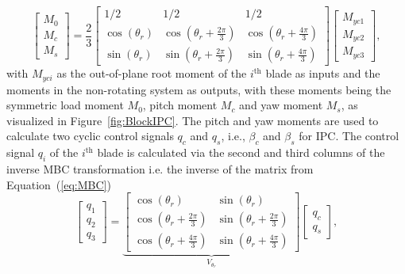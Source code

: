 \begin{equation} \label{eq:MBC}
    \left[ \begin{array}{c}
        M_0\\
        M_c\\
        M_s
    \end{array} \right] = \frac{2}{3}
    \left[ \begin{array}{ccc}
        1/2 & 1/2 & 1/2\\
        \cos(\theta_{r}) & \cos(\theta_{r} + \frac{2\pi}{3}) & \cos(\theta_{r} + \frac{4\pi}{3})\\
        \sin(\theta_{r}) & \sin(\theta_{r} + \frac{2\pi}{3}) & \sin(\theta_{r} + \frac{4\pi}{3})
    \end{array} \right]
    \left[ \begin{array}{c}
        M_{yc1}\\
        M_{yc2}\\
        M_{yc3}
    \end{array} \right], 
\end{equation}
with  $M_{yci}$ as the out-of-plane root moment of the $i^{\text{th}}$ blade as inputs and the moments in the non-rotating system as outputs, with these moments being the symmetric load moment $M_0$, pitch moment $M_c$ and yaw moment $M_s$, as visualized in Figure~\ref{fig:BlockIPC}. The pitch and yaw moments are used to calculate two cyclic control signals $q_c$ and $q_s$, i.e., $\beta_c$ and $\beta_s$ for IPC. 
The control signal $q_i$ of the $i^{\text{th}}$ blade is calculated via the second and third columns of the inverse MBC transformation i.e. the inverse of the matrix from Equation~(\ref{eq:MBC}) %
\begin{equation} \label{eq:inverseMBC}
    \left[ \begin{array}{c}
        q_1\\
        q_2\\
        q_3
    \end{array} \right] = 
    \underbrace{\left[ \begin{array}{ccc}
            \cos(\theta_{r}) &  \sin(\theta_{r})\\
            \cos(\theta_{r} + \frac{2\pi}{3}) &  \sin(\theta_{r} + \frac{2\pi}{3})\\
            \cos(\theta_{r} + \frac{4\pi}{3}) &  \sin(\theta_{r} + \frac{4\pi}{3})
        \end{array} \right]}_{V_{\theta_{r}}}
    \left[ \begin{array}{c}
        q_c\\
        q_s
    \end{array} \right],
\end{equation}
